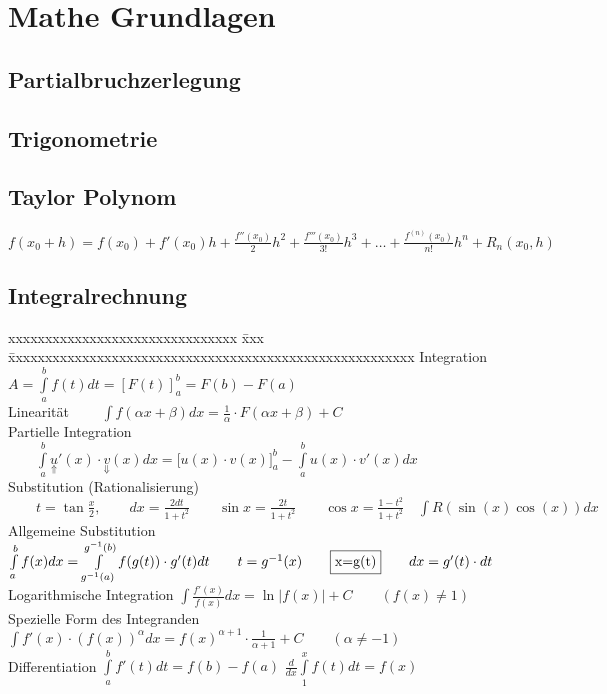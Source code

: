 \section{Mathe Grundlagen}

\subsection{Partialbruchzerlegung}


\subsection{Trigonometrie}


\subsection{Taylor Polynom}
$f(x_0+h)=f(x_0) + f'(x_0)h + \frac{f''(x_0)}{2}h^2 + \frac{f'''(x_0)}{3!}h^3 + \ldots + \frac{f^{(n)}(x_0)}{n!}h^n + R_n(x_0, h)$

\subsection{Integralrechnung}
\begin{tabbing}
	xxxxxxxxxxxxxxxxxxxxxxxxxxxxxxx \= xxx \= xxxxxxxxxxxxxxxxxxxxxxxxxxxxxxxxxxxxxxxxxxxxxxxxxxxxxxx\kill
	Integration\>\>$A=\int\limits_{a}^{b}{f(t)dt}=\left[F(t)\right]_a^b=F(b)-F(a)$\\[0.2cm]
	Linearität\>
	$\qquad\int{f(\alpha x+\beta )dx=\frac{1}{\alpha}\cdot F(\alpha x+
			\beta)+C}$\\[0.2cm]
	Partielle Integration\>
	$\qquad\int\limits_a^b{\underset{\Uparrow}{u}'(x)\cdot \underset{\Downarrow}{v}(x)dx}=\biggl[ u(x)\cdot v(x) \biggr]_a^b
		-\int\limits_a^b{u(x)\cdot v'(x)dx}$\\[0.2cm]
	Substitution (Rationalisierung)\>
	$\qquad t=\tan\frac{x}{2}, \qquad dx=\frac{2dt}{1+t^2} \qquad
		\sin  x=\frac{2t}{1+t^2} \qquad \cos x=\frac{1-t^2}{1+t^2}
		\quad\int{R(\sin(x)\cos(x))dx}$\\
	Allgemeine Substitution \> \>
	$\int\limits_{a}^{b}{f(x)dx}=\int\limits_{g^{-1}(a)}^{g^{-1}(b)}{f(g(t))\cdot
			g'(t)dt}\qquad t=g^{-1}(x)\qquad  \fbox{x=g(t)}\qquad dx=g'(t)\cdot dt$\\
	Logarithmische Integration \>\>
	$ \int{\frac{f'(x)}{f(x)}dx}=\ln|f(x)|+C	\qquad{(f(x)\neq 1)}$\\[0.2cm]
	Spezielle Form des Integranden \>\>
	$\int{f'(x)\cdot (f(x))^{\alpha} dx}= f(x)^{\alpha +1}\cdot
		\frac{1}{\alpha+1}+C \qquad{(\alpha \neq -1)}$\\
	Differentiation\>\>
	$\int \limits ^{b} _{a} {f'(t)dt}=f(b)-f(a)$\qquad
	$\frac{d}{dx} \int \limits ^{x} _{1} {f(t)dt}=f(x)$
\end{tabbing}

